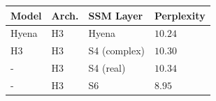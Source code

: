 \begin{tabular}{llll}
\hline
\textbf{Model} & \textbf{Arch.} & \textbf{SSM Layer} & \textbf{Perplexity} \\
\hline
Hyena & H3 & Hyena & $10.24$ \\
H3 & H3 & S4 (complex) & $10.30$ \\
- & H3 & S4 (real) & $10.34$ \\
- & H3 & S6 & $\mathbf{8.95}$ \\
\hline
\end{tabular}
